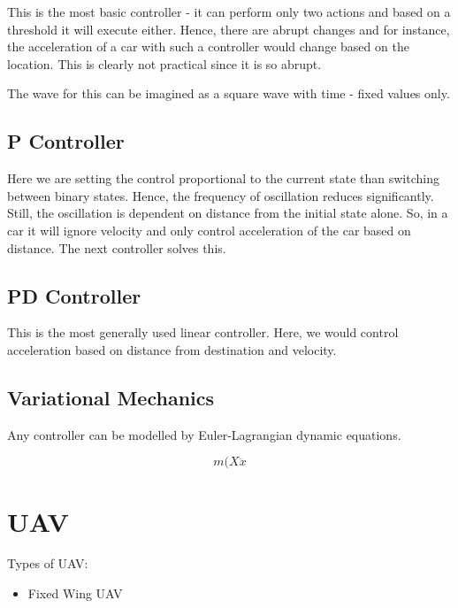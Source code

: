 This is the most basic controller - it can perform only two actions and based on a threshold it will execute either. Hence, there are abrupt changes and for instance, the acceleration of a car with such a controller would change based on the location. This is clearly not practical since it is so abrupt.

The wave for this can be imagined as a square wave with time - fixed values only.

\section{P Controller}

Here we are setting the control proportional to the current state than switching between binary states. Hence, the frequency of oscillation reduces significantly. Still, the oscillation is dependent on distance from the initial state alone. So, in a car it will ignore velocity and only control acceleration of the car based on distance. The next controller solves this.

\section{PD Controller}

This is the most generally used linear controller. Here, we would control acceleration based on distance from destination and velocity. 

\section{Variational Mechanics}

Any controller can be modelled by Euler-Lagrangian dynamic equations. 

\begin{equation}
    m(X\ddot{x}
\end{equation}

\chapter{UAV}

Types of UAV:

\begin{itemize}
    \item Fixed Wing UAV
\end{itemize}